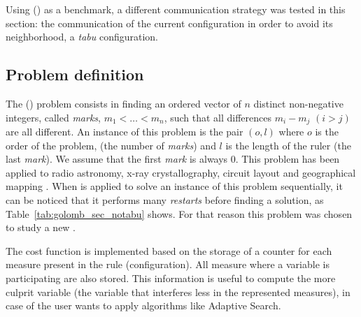 Using \grp{} (\GRP) as a benchmark, a different communication strategy was tested in this section: the communication of the current configuration in order to avoid its neighborhood, \ie a {\it tabu} configuration.

\subsection{Problem definition}

The \grp{} (\GRP) problem consists in finding an ordered vector of $n$ distinct non-negative integers, called \textit{marks}, $m_1 < \dots < m_n$, such that all differences $m_i - m_j$ $(i > j)$  are all different. An instance of this problem is the pair $(o,l)$ where $o$ is the order of the problem, (\ie the number of \textit{marks}) and $l$ is the length of the ruler (\ie the last {\it mark}). We assume that the first \textit{mark} is always 0. This problem has been applied to radio astronomy, x-ray crystallography, circuit layout and geographical mapping \cite{Soliday1995}. 
When \posl{} is applied to solve an instance of this problem sequentially, it can be noticed that it performs many {\it restarts} before finding a solution, as Table~\ref{tab:golomb_sec_notabu} shows. For that reason this problem was chosen to study a new \commstr.

The cost function is implemented based on the storage of a counter for each measure present in the rule (configuration). All measure where a variable is participating are also stored. This information is useful to compute the more culprit variable (the variable that interferes less in the represented measures), in case of the user wants to apply algorithms like Adaptive Search. 

